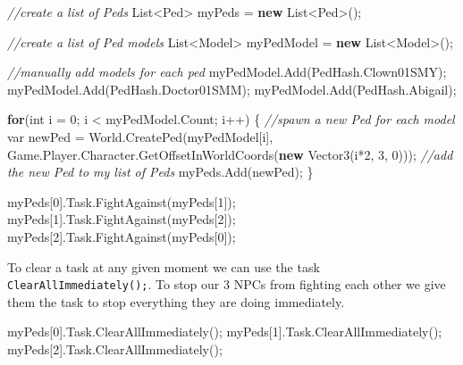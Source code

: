 \documentclass[
  openany]{book}
\newenvironment{Shaded}{\begin{snugshade}}{\end{snugshade}}
\newcommand{\CommentTok}[1]{\textcolor[rgb]{0.56,0.35,0.01}{\textit{#1}}}
\newcommand{\DataTypeTok}[1]{\textcolor[rgb]{0.13,0.29,0.53}{#1}}
\newcommand{\DecValTok}[1]{\textcolor[rgb]{0.00,0.00,0.81}{#1}}
\newcommand{\FunctionTok}[1]{\textcolor[rgb]{0.00,0.00,0.00}{#1}}
\newcommand{\KeywordTok}[1]{\textcolor[rgb]{0.13,0.29,0.53}{\textbf{#1}}}
\newcommand{\NormalTok}[1]{#1}
\begin{document}
\begin{Shaded}
\begin{Highlighting}[]
\CommentTok{//create a list of Peds}
\NormalTok{List<Ped> myPeds = }\KeywordTok{new}\NormalTok{ List<Ped>();}

\CommentTok{//create a list of Ped models }
\NormalTok{List<Model> myPedModel = }\KeywordTok{new}\NormalTok{ List<Model>();}

\CommentTok{//manually add models for each ped}
\NormalTok{myPedModel.}\FunctionTok{Add}\NormalTok{(PedHash.}\FunctionTok{Clown01SMY}\NormalTok{);}
\NormalTok{myPedModel.}\FunctionTok{Add}\NormalTok{(PedHash.}\FunctionTok{Doctor01SMM}\NormalTok{);}
\NormalTok{myPedModel.}\FunctionTok{Add}\NormalTok{(PedHash.}\FunctionTok{Abigail}\NormalTok{);}


\KeywordTok{for}\NormalTok{(}\DataTypeTok{int}\NormalTok{ i = }\DecValTok{0}\NormalTok{; i < myPedModel.}\FunctionTok{Count}\NormalTok{; i++)}
\NormalTok{\{}
    \CommentTok{//spawn a new Ped for each model}
    \DataTypeTok{var}\NormalTok{ newPed = World.}\FunctionTok{CreatePed}\NormalTok{(myPedModel[i], Game.}\FunctionTok{Player}\NormalTok{.}\FunctionTok{Character}\NormalTok{.}\FunctionTok{GetOffsetInWorldCoords}\NormalTok{(}\KeywordTok{new} \FunctionTok{Vector3}\NormalTok{(i*}\DecValTok{2}\NormalTok{, }\DecValTok{3}\NormalTok{, }\DecValTok{0}\NormalTok{)));}
    \CommentTok{//add the new Ped to my list of Peds}
\NormalTok{    myPeds.}\FunctionTok{Add}\NormalTok{(newPed);}
\NormalTok{\}}

\NormalTok{myPeds[}\DecValTok{0}\NormalTok{].}\FunctionTok{Task}\NormalTok{.}\FunctionTok{FightAgainst}\NormalTok{(myPeds[}\DecValTok{1}\NormalTok{]);}
\NormalTok{myPeds[}\DecValTok{1}\NormalTok{].}\FunctionTok{Task}\NormalTok{.}\FunctionTok{FightAgainst}\NormalTok{(myPeds[}\DecValTok{2}\NormalTok{]);}
\NormalTok{myPeds[}\DecValTok{2}\NormalTok{].}\FunctionTok{Task}\NormalTok{.}\FunctionTok{FightAgainst}\NormalTok{(myPeds[}\DecValTok{0}\NormalTok{]);}
\end{Highlighting}
\end{Shaded}

To clear a task at any given moment we can use the task \texttt{ClearAllImmediately();}. To stop our 3 NPCs from fighting each other we give them the task to stop everything they are doing immediately.

\begin{Shaded}
\begin{Highlighting}[]
\NormalTok{myPeds[}\DecValTok{0}\NormalTok{].}\FunctionTok{Task}\NormalTok{.}\FunctionTok{ClearAllImmediately}\NormalTok{();}
\NormalTok{myPeds[}\DecValTok{1}\NormalTok{].}\FunctionTok{Task}\NormalTok{.}\FunctionTok{ClearAllImmediately}\NormalTok{();}
\NormalTok{myPeds[}\DecValTok{2}\NormalTok{].}\FunctionTok{Task}\NormalTok{.}\FunctionTok{ClearAllImmediately}\NormalTok{();}
\end{Highlighting}
\end{Shaded}
\end{document}
